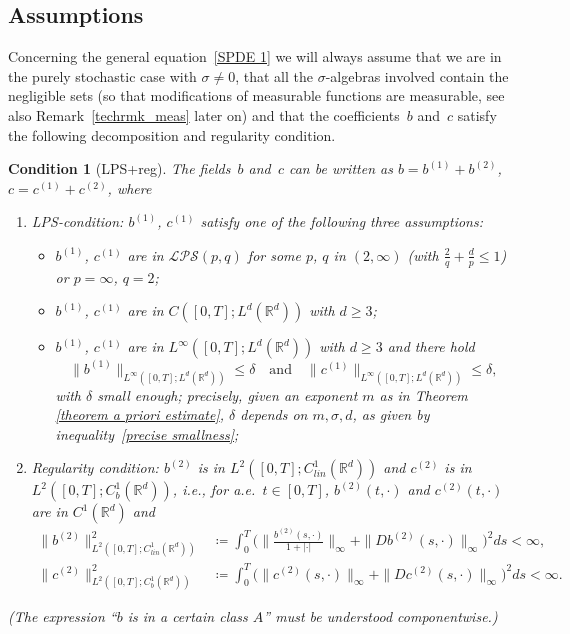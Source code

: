 \documentclass[a4paper,10pt]{article}
\newtheorem{condition}[theorem]{Condition}
\newcommand\1{\mathbbm{1}}
\numberwithin{equation}{section}
\begin{document}
\subsection{Assumptions\label{subsection regularity assumptions}}

Concerning the general equation~\eqref{SPDE 1} we will always assume that we are in the purely stochastic case with $\sigma\neq0$, that all the $\sigma$-algebras involved contain the negligible sets (so that modifications of measurable functions are measurable, see also Remark~\ref{techrmk_meas} later on) and that the coefficients~$b$ and~$c$ satisfy the following decomposition and regularity condition.

\begin{condition}[LPS+reg]
\label{LPSreg}
The fields~$b$ and~$c$ can be written as $b=b^{(1)}+b^{(2)}$, $c=c^{(1)}+c^{(2)}$, where 
\begin{enumerate}[font=\normalfont]
\item \emph{LPS-condition:} $b^{(1)}$, $c^{(1)}$ satisfy one of the following three assumptions:
 \begin{itemize}[font=\normalfont]
   \item[a)] $b^{(1)}$, $c^{(1)}$ are in $\mathcal{LPS}(p,q)$ for some $p$, $q$ in
$(2,\infty)$ \textup{(}with $\frac2q+\frac{d}{p}\le1$\textup{)} or $p=\infty$, $q=2$;
   \item[b)] $b^{(1)}$, $c^{(1)}$ are in $C([0,T];L^{d}(\mathbb{R}^{d}))$ with $d \geq 3$;
   \item[c)] $b^{(1)}$, $c^{(1)}$ are in $L^{\infty}([0,T];L^{d}(\mathbb{R}^{d}))$
with $d \geq 3$ and there hold
\[
\|b^{(1)}\|_{L^{\infty}([0,T];L^{d}(\mathbb{R}^{d}))}\le\delta \quad \text{and} \quad
\|c^{(1)}\|_{L^{\infty}([0,T];L^{d}(\mathbb{R}^{d}))} \le\delta,
\]
with $\delta$ small enough; precisely, given an exponent $m$ as in Theorem
\ref{theorem a priori estimate}, $\delta$ depends on $m,\sigma,d$, as given by
inequality~\eqref{precise smallness};
 \end{itemize}
   
\item \emph{Regularity condition:} $b^{(2)}$ is in $L^{2}([0,T];C^{1}_{lin}(\mathbb{R}^{d}))$ and $c^{(2)}$
is in $L^{2}([0,T];C^{1}_{b}(\mathbb{R}^{d}))$, i.e., for a.e.~$t \in [0,T]$,
$b^{(2)}(t,\cdot)$ and $c^{(2)}(t,\cdot)$ are in $C^{1}(\mathbb{R}^{d})$ and
\begin{align*}
\|b^{(2)}\|_{L^{2}([0,T];C^{1}_{lin}(\mathbb{R}^{d}))}^2 & \coloneqq \int^{T}_{0}\Big(
\Big\| \frac{b^{(2)}(s,\cdot)}{1+|\cdot|}\Big\|_{\infty}+\|Db^{(2)} 
(s,\cdot)\|_{\infty}\Big)^2 ds<\infty,\\
\|c^{(2)}\|_{L^{2}([0,T];C^{1}_{b}(\mathbb{R}^{d}))}^2 & \coloneqq \int^{T}_{0}\Big(
\|c^{(2)}(s,\cdot)\|_{\infty}+\|Dc^{(2)}(s,\cdot)\|_{\infty}\Big)^2 ds<\infty .
\end{align*}

\end{enumerate}

\textup{(}The expression ``$b$ is in a certain class $A$'' must be understood componentwise.\textup{)}
\end{condition}
\end{document}

